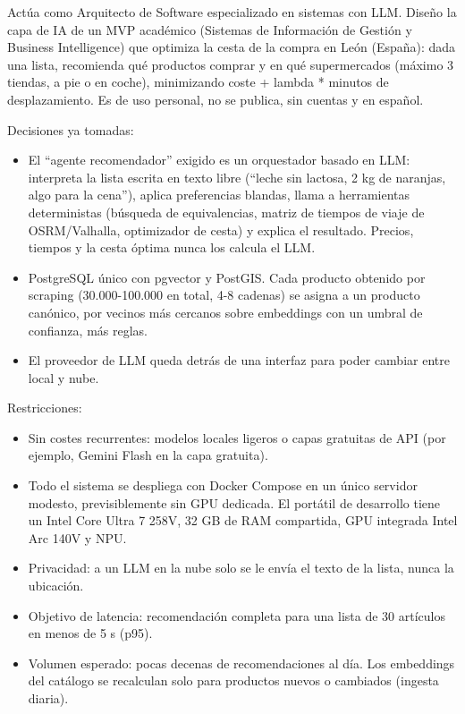 \begin{tcolorbox}[colback=promptcolor, title=Prompt Introducido, colframe=blue!50!black, breakable]
	Actúa como Arquitecto de Software especializado en sistemas con LLM. Diseño la capa de IA de un MVP académico (Sistemas de Información de Gestión y Business Intelligence) que optimiza la cesta de la compra en León (España): dada una lista, recomienda qué productos comprar y en qué supermercados (máximo 3 tiendas, a pie o en coche), minimizando coste + lambda * minutos de desplazamiento. Es de uso personal, no se publica, sin cuentas y en español.

	Decisiones ya tomadas:
	\begin{itemize}
		\item El ``agente recomendador'' exigido es un orquestador basado en LLM: interpreta la lista escrita en texto libre (``leche sin lactosa, 2 kg de naranjas, algo para la cena''), aplica preferencias blandas, llama a herramientas deterministas (búsqueda de equivalencias, matriz de tiempos de viaje de OSRM/Valhalla, optimizador de cesta) y explica el resultado. Precios, tiempos y la cesta óptima nunca los calcula el LLM.
		\item PostgreSQL único con pgvector y PostGIS. Cada producto obtenido por scraping (30.000-100.000 en total, 4-8 cadenas) se asigna a un producto canónico, por vecinos más cercanos sobre embeddings con un umbral de confianza, más reglas.
		\item El proveedor de LLM queda detrás de una interfaz para poder cambiar entre local y nube.
	\end{itemize}

	Restricciones:
	\begin{itemize}
		\item Sin costes recurrentes: modelos locales ligeros o capas gratuitas de API (por ejemplo, Gemini Flash en la capa gratuita).
		\item Todo el sistema se despliega con Docker Compose en un único servidor modesto, previsiblemente sin GPU dedicada. El portátil de desarrollo tiene un Intel Core Ultra 7 258V, 32 GB de RAM compartida, GPU integrada Intel Arc 140V y NPU.
		\item Privacidad: a un LLM en la nube solo se le envía el texto de la lista, nunca la ubicación.
		\item Objetivo de latencia: recomendación completa para una lista de 30 artículos en menos de 5 s (p95).
		\item Volumen esperado: pocas decenas de recomendaciones al día. Los embeddings del catálogo se recalculan solo para productos nuevos o cambiados (ingesta diaria).
	\end{itemize}


\end{tcolorbox}
